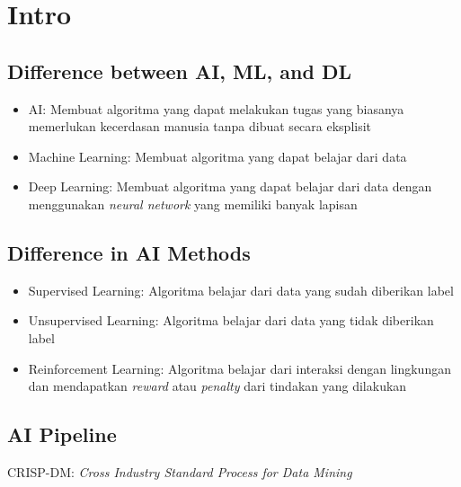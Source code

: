 \documentclass[conference]{IEEEtran}
\begin{document}
\title{}

\author{\IEEEauthorblockN{} }

\maketitle

\section{Intro}

\subsection{Difference between AI, ML, and DL}

\begin{itemize}
    \item AI: Membuat algoritma yang dapat melakukan tugas yang biasanya memerlukan kecerdasan manusia tanpa dibuat secara eksplisit
    \item Machine Learning: Membuat algoritma yang dapat belajar dari data
    \item Deep Learning: Membuat algoritma yang dapat belajar dari data dengan menggunakan \textit{neural network} yang memiliki banyak lapisan
\end{itemize}

\subsection{Difference in AI Methods}

\begin{itemize}
    \item Supervised Learning: Algoritma belajar dari data yang sudah diberikan label
    \item Unsupervised Learning: Algoritma belajar dari data yang tidak diberikan label
    \item Reinforcement Learning: Algoritma belajar dari interaksi dengan lingkungan dan mendapatkan \textit{reward} atau \textit{penalty} dari tindakan yang dilakukan
\end{itemize}

\subsection{AI Pipeline}

CRISP-DM: \textit{Cross Industry Standard Process for Data Mining}
\end{document}
